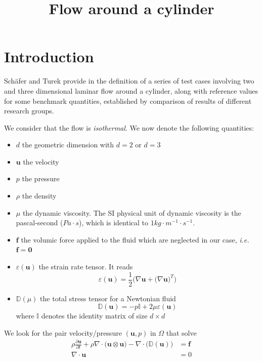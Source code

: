 \documentclass[11pt,a4paper]{article}
\date{}%
\title{Flow around a cylinder}
\author{}
\date{}
\renewcommand{\vec}[1]{\boldsymbol{#1}}
\begin{document}
\maketitle
\thispagestyle{empty}

\section{Introduction}

Sch\"afer and Turek provide in \cite{schaefer:1996} the definition of
a series of test cases involving two and three dimensional laminar
flow around a cylinder, along with reference values for some benchmark
quantities, established by comparison of results of different research
groups.


We consider that the flow is \emph{isothermal}. We now denote the
following quantities:
\begin{itemize}
\item $d$ the geometric dimension with $d=2$ or $d=3$
\item $\vec{u}$ the velocity
\item $p$ the pressure
\item $\rho$ the density
\item $\mu$ the dynamic viscosity. The SI physical unit of dynamic
  viscosity is the pascal-second ($Pa\cdot s$), which is identical to $1
  kg\cdot m^{-1} \cdot s^{-1}$.
\item $\vec{f}$ the volumic force applied to the fluid which are
  neglected in our case, \emph{i.e.} $\vec{f} = \vec{0}$
\item  $\varepsilon(\vec{u})$ the strain rate tensor. It reads
\begin{equation}
  \label{eq:3}
  \mathbb{\varepsilon}(\vec{u}) = \frac{1}{2} \Big( \nabla \vec{u} + \big( \nabla \vec{u} \big)^T \Big)
\end{equation}
\item $\mathbb{D}( \mu )$ the total stress tensor for a Newtonian fluid
\begin{equation}
  \label{eq:2}
  \mathbb{D}( \vec{u} ) = -p \mathbb{I} + 2 \mu \mathbb{\varepsilon}(\vec{u})
\end{equation}
where $\mathbb{I}$ denotes the identity matrix of size $d \times d$

\end{itemize}



We look for the pair velocity/pressure $(\vec{u}, p)$ in $\Omega$ that
solve
  \begin{eqnarray}
    \rho \frac{\partial \vec{u} }{\partial t} + \rho \nabla \cdot \big( \vec{u} \otimes \vec{u} \big) - \nabla \cdot \big(  \mathbb{D} (\vec{u}) ) & = \displaystyle\vec{f}   \label{eq:1}\\
    \nabla \cdot \vec{u} & =  0 \label{eq:7}
  \end{eqnarray}
\end{document}
